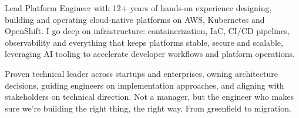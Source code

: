 
Lead Platform Engineer with 12+ years of hands-on experience designing, building and operating cloud-native platforms on AWS, Kubernetes and OpenShift. I go deep on infrastructure: containerization, IaC, CI/CD pipelines, observability and everything that keeps platforms stable, secure and scalable, leveraging AI tooling to accelerate developer workflows and platform operations.

Proven technical leader across startups and enterprises, owning architecture decisions, guiding engineers on implementation approaches, and aligning with stakeholders on technical direction. Not a manager, but the engineer who makes sure we're building the right thing, the right way. From greenfield to migration.

\vspace{0.05cm}
